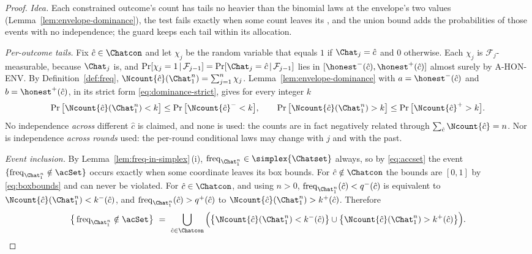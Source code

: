 \begin{proof}
\emph{Idea.} Each constrained outcome's count has tails no heavier than the
binomial laws at the envelope's two values (Lemma~\ref{lem:envelope-dominance}),
the test fails exactly when some count leaves its , and the
union bound adds the probabilities of those events with no independence;
the guard keeps each tail within its allocation.

\emph{Per-outcome tails.} Fix $\hat c\in\Chatcon$ and let $\chi_j$ be the
random variable that equals $1$ if $\Chat_j=\hat c$ and $0$ otherwise. Each
$\chi_j$ is $\mathcal{F}_j$-measurable, because $\Chat_j$ is, and
$\Pr[\chi_j=1\,|\,\mathcal{F}_{j-1}]=\Pr[\Chat_j=\hat c\,|\,\mathcal{F}_{j-1}]$
lies in $[{\honest}^{-}(\hat c),{\honest}^{+}(\hat c)]$ almost surely by
A-HON-ENV. By Definition~\ref{def:freq},
$\Ncount{\hat c}(\Chat_1^n)=\sum_{j=1}^{n}\chi_j$. Lemma~\ref{lem:envelope-dominance}
with $a={\honest}^{-}(\hat c)$ and $b={\honest}^{+}(\hat c)$, in its strict
form \eqref{eq:dominance-strict}, gives for every integer $k$
\begin{equation*}
  \Pr\big[\Ncount{\hat c}(\Chat_1^n)<k\big]\le\Pr\big[\Ncount{\hat c}^{-}<k\big],
  \qquad
  \Pr\big[\Ncount{\hat c}(\Chat_1^n)>k\big]\le\Pr\big[\Ncount{\hat c}^{+}>k\big].
\end{equation*}
No independence \emph{across} different $\hat c$ is claimed, and none is
used: the counts are in fact negatively related through
$\sum_{\hat c}\Ncount{\hat c}=n$. Nor is independence \emph{across rounds}
used: the per-round conditional laws may change with $j$ and with the past.

\emph{Event inclusion.} By Lemma~\ref{lem:freq-in-simplex}\,(i),
$\operatorname{freq}_{\Chat_1^n}\in\simplex{\Chatset}$ always, so by
\eqref{eq:accset} the event $\{\operatorname{freq}_{\Chat_1^n}\notin\acSet\}$
occurs exactly when some coordinate leaves its box bounds. For
$\hat c\notin\Chatcon$ the bounds are $[0,1]$ by \eqref{eq:boxbounds} and can
never be violated. For $\hat c\in\Chatcon$, and using $n>0$,
$\operatorname{freq}_{\Chat_1^n}(\hat c)<q^{-}(\hat c)$ is equivalent to
$\Ncount{\hat c}(\Chat_1^n)<k^{-}(\hat c)$, and
$\operatorname{freq}_{\Chat_1^n}(\hat c)>q^{+}(\hat c)$ to
$\Ncount{\hat c}(\Chat_1^n)>k^{+}(\hat c)$. Therefore
\begin{equation*}
  \big\{\operatorname{freq}_{\Chat_1^n}\notin\acSet\big\}
  \ =\ \bigcup_{\hat c\in\Chatcon}
  \Big(\big\{\Ncount{\hat c}(\Chat_1^n)<k^{-}(\hat c)\big\}
  \cup\big\{\Ncount{\hat c}(\Chat_1^n)>k^{+}(\hat c)\big\}\Big).
\end{equation*}


\end{proof}

